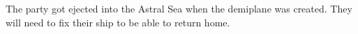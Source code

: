 The party got ejected into the Astral Sea when the demiplane was created.
They will need to fix their ship to be able to return home.